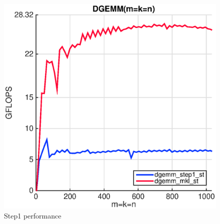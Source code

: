 %
%
%
%
%
%
%


\begin{figure}[!htp]
  \centering
  \includegraphics[scale=.5]{figures/step1_single_thread_ivy.eps}
  \caption{Step1 performance}
  \label{fig:naive}
\end{figure} 

